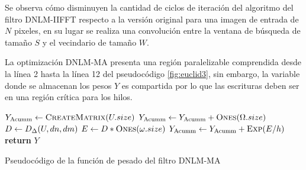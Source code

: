 Se observa c\'omo disminuyen la cantidad de ciclos de iteración del algoritmo del filtro DNLM-IIFFT respecto a la versión original para una imagen de entrada  de $N$ pixeles, en su lugar se realiza una convolución entre la ventana de búsqueda \mat{\Omega} de tama\~no $S$ y el vecindario de tama\~no $W$. 

La optimización DNLM-MA presenta una región paralelizable comprendida desde la línea 2 hasta la línea 12 del pseudoc\'odigo \ref{fig:euclid3}, sin embargo, la variable donde se almacenan los pesos $Y$ es compartida por lo que las escrituras deben ser en una región crítica para los hilos. 


\begin{algorithm}
\begin{algorithmic}[1]
\State $Y_{\text{Acumm}}\gets \Call{CreateMatrix}{U.size}$
			\State $Y_{\text{Acumm}}\gets Y_{\text{Acumm}} + \Call{Ones}{\Omega.size}$
		\Else
			\State $D\gets \Call{$D_{\Delta}$}{U,dn,dm}$  
			\State $E\gets D * \Call{Ones}{\omega.size}$ 
			\State $Y_{\text{Acumm}}\gets Y_{\text{Acumm}} + \Call{Exp}{E/h}$ 
		\EndIf
	\EndFor
\EndFor
\State \textbf{return} $Y$
\end{algorithmic}
\caption{Pseudocódigo de la funci\'on de pesado del filtro DNLM-MA\label{fig:euclid3}}
\end{algorithm}


 

